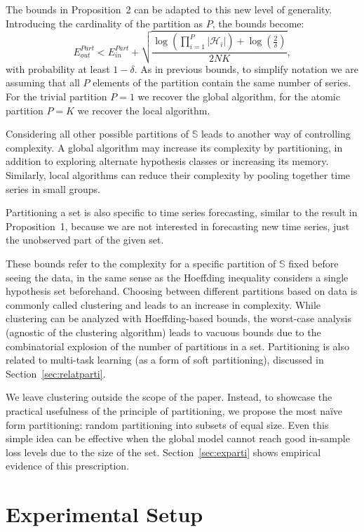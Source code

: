 \documentclass[a4paper]{article}
\theoremstyle{custom}
\begin{document}
The bounds in Proposition~2 can be adapted to this new level of generality. Introducing the cardinality of the partition as $P$, the bounds become:
$$
  E_{\textit{out}}^{Part} < E_{\textit{in}}^{Part} +  \sqrt{ \frac{\log(\prod_{i=1}^P|\mathcal{H}_i |) + \log(\frac{2}{\delta})}{2NK}},
$$
with probability at least $1 - \delta$.
As in previous bounds, to simplify notation we are assuming that all $P$ elements of the partition contain the same number of series. For the trivial partition $P=1$ we recover the global algorithm,
for the atomic partition $P=K$ we recover the local algorithm.

Considering all other possible partitions of $\mathbb{S}$ leads to another way of controlling complexity. A global algorithm may increase its complexity by partitioning, in addition to exploring alternate hypothesis classes or increasing its memory. Similarly, local algorithms can reduce their complexity by pooling together time series in small groups.

Partitioning a set is also specific to time series forecasting, similar to the result in Proposition~1, because we are not interested in forecasting new time series, just the unobserved part of the given set.

These bounds refer to the complexity for a specific partition of $\mathbb{S}$ fixed before seeing the data, in the same sense as the Hoeffding inequality considers a single hypothesis set beforehand. Choosing between different partitions based on data is commonly called clustering and leads to an increase in complexity. While clustering can be analyzed with Hoeffding-based bounds, the worst-case analysis (agnostic of the clustering algorithm) leads to vacuous bounds due to the combinatorial explosion of the number of partitions in a set. Partitioning is also related to multi-task learning (as a form of soft partitioning), discussed in Section~\ref{sec:relatparti}.

We leave clustering outside the scope of the paper. Instead, to showcase the practical usefulness of the principle of partitioning, we propose the most naïve form partitioning: random partitioning into subsets of equal size. Even this simple idea can be effective when the global model cannot reach good in-sample loss levels due to the size of the set.
Section~\ref{sec:exparti} shows empirical evidence of this prescription.

\section{Experimental Setup}
\label{sec:experisetup}
\end{document}
